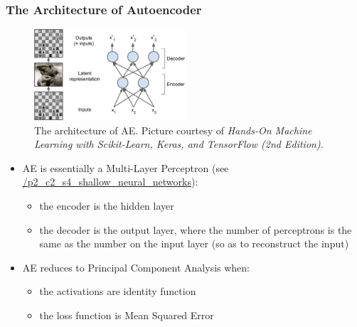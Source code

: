 \documentclass{beamer}
\begin{document}
\begin{frame}
\setlength{\leftmargini}{0.3cm}
\setlength{\leftmarginii}{0.6cm}
\setlength{\leftmarginiii}{0.9cm}
\frametitle{The Architecture of Autoencoder}
\begin{figure}[h!]
\centering
\includegraphics[width=0.5\textwidth]{./figure/ae}
\renewcommand\thefigure{1}
\addtocounter{figure}{-1}
\caption{The architecture of AE. Picture courtesy of \emph{Hands-On Machine Learning with Scikit-Learn, Keras, and TensorFlow (2nd Edition).}}
\end{figure}
\vspace{-0.5cm}
\begin{itemize}
\footnotesize
\item AE is essentially a Multi-Layer Perceptron (see \textcolor{blue}{\underline{\href{https://github.com/yuxiaohuang/teaching/blob/master/gwu/machine_learning_I/spring_2023/slides/p2_shallow_learning/p2_c2_supervised_learning/p2_c2_s4_shallow_neural_networks/shallow_neural_networks.pdf}{/p2\_c2\_s4\_shallow\_neural\_networks}}}):
	\begin{itemize}
	\footnotesize
	\item the encoder is the hidden layer
	\item the decoder is the output layer, where the number of perceptrons is the same as the number on the input layer (so as to reconstruct the input)
	\end{itemize}
\item AE reduces to Principal Component Analysis when:
	\begin{itemize}
	\footnotesize
	\item the activations are identity function
	\item the loss function is Mean Squared Error
	\end{itemize}
\end{itemize}
\end{frame}
\end{document}
